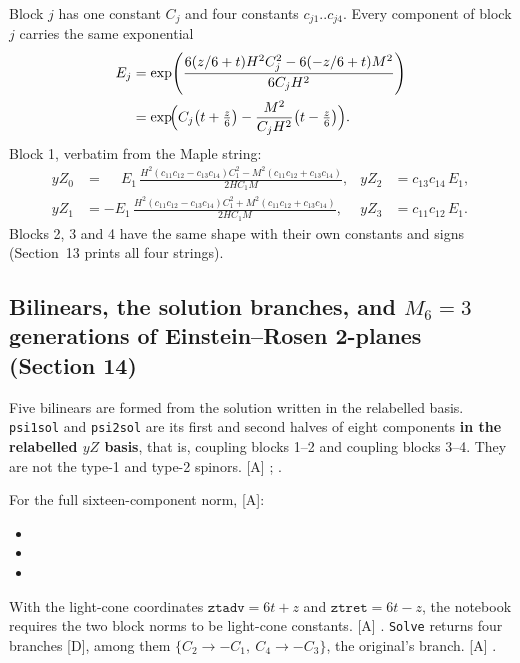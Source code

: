 Block $j$ has one constant $C_j$ and four constants $c_{j1}..c_{j4}$. Every component of block $j$
carries the same exponential
\begin{align}
  E_j&=\exp\!\left(\frac{6(z/6+t)H^2C_j^2-6(-z/6+t)M^2}{6C_jH^2}\right)\notag\\
     &=\exp\!\Bigl(C_j\bigl(t+\tfrac z6\bigr)-\frac{M^2}{C_jH^2}\bigl(t-\tfrac z6\bigr)\Bigr).
\end{align}
Block 1, verbatim from the Maple string:
\begin{align*}
yZ_0 &= \phantom{-}E_1\,\frac{H^2(c_{11}c_{12}-c_{13}c_{14})C_1^2 - M^2(c_{11}c_{12}+c_{13}c_{14})}{2HC_1M}, &
yZ_2 &= c_{13}c_{14}\,E_1,\\
yZ_1 &= -E_1\,\frac{H^2(c_{11}c_{12}-c_{13}c_{14})C_1^2 + M^2(c_{11}c_{12}+c_{13}c_{14})}{2HC_1M}, &
yZ_3 &= c_{11}c_{12}\,E_1.
\end{align*}
Blocks 2, 3 and 4 have the same shape with their own constants and signs (Section~13 prints all
four strings).

\subsection{Bilinears, the solution branches, and \texorpdfstring{$M_6=3$}{M6 = 3} generations of Einstein--Rosen 2-planes (Section 14)}
\label{fnd:M6}\label{sec:2.10}

Five bilinears are formed from the solution written in the relabelled basis.
\texttt{psi1sol} and \texttt{psi2sol} are its first and second halves of eight components
\textbf{in the relabelled $yZ$ basis}, that is, coupling blocks 1--2 and coupling blocks 3--4.
They are not the type-1 and type-2 spinors. [A]
;
.

For the full sixteen-component norm, [A]:
\begin{itemize}
  \item {}
  \item {}
  \item {}
\end{itemize}

With the light-cone coordinates $\texttt{ztadv}=6t+z$ and $\texttt{ztret}=6t-z$, the notebook
requires the two block norms to be light-cone constants. [A]
. \texttt{Solve} returns four branches
[D], among them $\{C_2\to-C_1,\ C_4\to-C_3\}$, the original's branch. [A]
.

